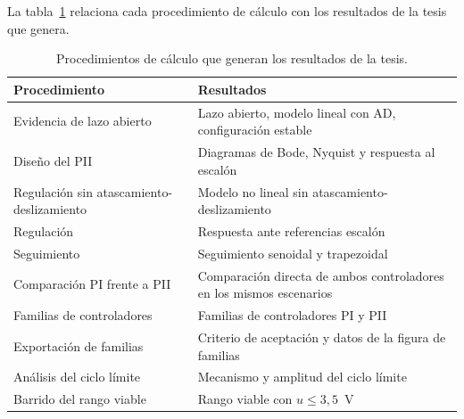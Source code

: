 La tabla~\ref{tab:scripts} relaciona cada procedimiento de cálculo con los resultados de la tesis que genera.

\begin{table}[ht]
\centering
\caption{Procedimientos de cálculo que generan los resultados de la tesis.}
\label{tab:scripts}
\small
\begin{tabular}{|p{}|p{}|}
\hline
Procedimiento & Resultados \\ \hline
Evidencia de lazo abierto & Lazo abierto, modelo lineal con AD, configuración estable \\ \hline
Diseño del PII & Diagramas de Bode, Nyquist y respuesta al escalón \\ \hline
Regulación sin atascamiento-deslizamiento & Modelo no lineal sin atascamiento-deslizamiento \\ \hline
Regulación & Respuesta ante referencias escalón \\ \hline
Seguimiento & Seguimiento senoidal y trapezoidal \\ \hline
Comparación PI frente a PII & Comparación directa de ambos controladores en los mismos escenarios \\ \hline
Familias de controladores & Familias de controladores PI y PII \\ \hline
Exportación de familias & Criterio de aceptación y datos de la figura de familias \\ \hline
Análisis del ciclo límite & Mecanismo y amplitud del ciclo límite \\ \hline
Barrido del rango viable & Rango viable con $u\le3{,}5$~V \\ \hline
\end{tabular}
\end{table}
